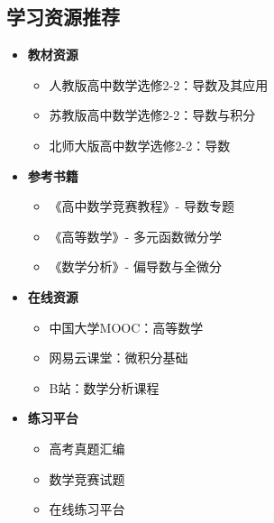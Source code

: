 \documentclass[a4paper,11pt]{ctexart}
\theoremstyle{definition}
\theoremstyle{remark}
\begin{document}
\subsection{学习资源推荐}

\begin{itemize}
    \item \textbf{教材资源}
    \begin{itemize}
        \item 人教版高中数学选修2-2：导数及其应用
        \item 苏教版高中数学选修2-2：导数与积分
        \item 北师大版高中数学选修2-2：导数
    \end{itemize}
    \item \textbf{参考书籍}
    \begin{itemize}
        \item 《高中数学竞赛教程》- 导数专题
        \item 《高等数学》- 多元函数微分学
        \item 《数学分析》- 偏导数与全微分
    \end{itemize}
    \item \textbf{在线资源}
    \begin{itemize}
        \item 中国大学MOOC：高等数学
        \item 网易云课堂：微积分基础
        \item B站：数学分析课程
    \end{itemize}
    \item \textbf{练习平台}
    \begin{itemize}
        \item 高考真题汇编
        \item 数学竞赛试题
        \item 在线练习平台
    \end{itemize}
\end{itemize}
\end{document}
